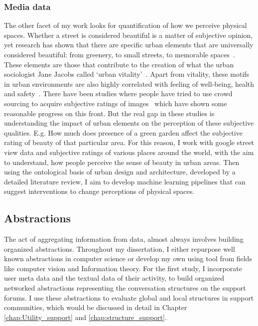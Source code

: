 \subsubsection{Media data}
The other facet of my work looks for quantification of how we perceive physical spaces. Whether a street is considered beautiful is a matter of subjective opinion, yet research has shown that there are specific urban elements that are universally considered beautiful: from greenery, to small streets, to memorable spaces~\cite{alexander1977pattern, quercia2014aesthetic,salesses2013collaborative}. These elements are those that contribute to the creation of what the urban sociologist Jane Jacobs called `urban vitality'~\cite{jacobs1961death}. Apart from vitality, these motifs in urban environments are also highly correlated with feeling of well-being, health and safety~\cite{kaplan1989experience}. There have been studies where people have tried to use crowd sourcing to acquire subjective ratings of images~\cite{seresinhe2015quantifying} which have shown some reasonable progress on this front. But the real gap in these studies is understanding the impact of urban elements on the perception of these subjective qualities. E.g. How much does presence of a green garden affect the subjective rating of beauty of that particular area. For this reason, I work with google street view data and subjective ratings of various places around the world\cite{naik2014streetscore}, with the aim to understand,  how people perceive the sense of beauty in urban areas. Then using the ontological basis of urban design and architecture, developed by a detailed literature review, I aim to develop machine learning pipelines that can suggest interventions to change perceptions of physical spaces.

\subsection{Abstractions}
The act of aggregating information from data, almost always involves building organized abstractions. Throughout my dissertation, I either repurpose well known abstractions in computer science or develop my own using tool from fields like computer vision and Information theory. For the first study, I incorporate user meta data and the textual data of their activity, to build organized networked abstractions representing the conversation structures on the support forums. I use these abstractions to evaluate global and local structures in support communities, which would be discussed in detail in Chapter \ref{chap:Utility_support} and \ref{chap:structure_support}. 
  
